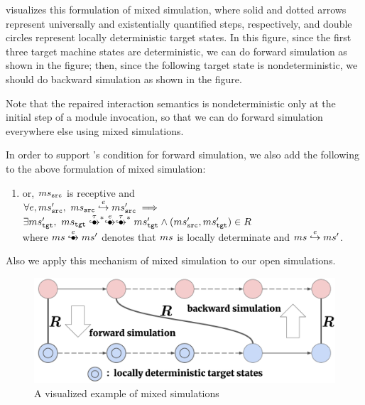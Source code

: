  visualizes this formulation of mixed simulation, where
solid and dotted arrows represent universally and existentially
quantified steps, respectively, and double circles represent locally
deterministic target states. In this figure,
since the first three target machine states are deterministic,
we can do forward simulation as shown in the figure;
then, since the following target state is nondeterministic,
we should do backward simulation as shown in the figure.

Note that the repaired interaction semantics is nondeterministic only
at the initial step of a module invocation, so that we can do
forward simulation everywhere else using mixed simulations.

In order to support \cc{}'s condition for forward simulation,
we also add the following to the above formulation of mixed simulation:
\begin{enumerate}[resume]
\item or, $ms{}_{\texttt{src}{}}$ is receptive and\\
  $\forall e, ms{}_{\texttt{src}{}}',~ ms{}_{\texttt{src}{}} \stackrel{e}{\hookrightarrow} ms{}_{\texttt{src}{}}' \implies {} $ \\
  $ \exists \mstgt',~ \mstgt \exstep{\tau}^{\raisebox{-1mm}{\scriptsize$\ast$}} \exstep{e}\exstep{\tau}^{\raisebox{-1mm}{\scriptsize$\ast$}} \mstgt' \land (\mssrc', \mstgt') \in R$\\
  where $\ms \exstep{e} \ms'$ denotes that $ms$ is locally determinate and $ms \stackrel{e}{\hookrightarrow} ms'$.
\end{enumerate}
Also we apply this mechanism of mixed simulation to our open simulations.

\begin{figure}[t]%
\includegraphics[width=1\textwidth]{images/mixed-sim-bold.pdf}
\caption{A visualized example of mixed simulations}
\label{fig:mixedsim}
\end{figure}
